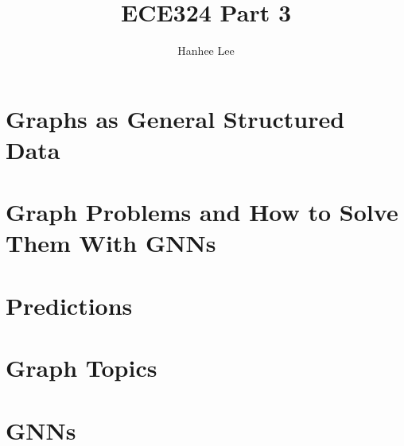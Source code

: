 \documentclass{article}
\title{ECE324 Part 3}
\author{Hanhee Lee}
\begin{document}
\section{Graphs as General Structured Data}

\newpage

\section{Graph Problems and How to Solve Them With GNNs}

\newpage

\section{Predictions}

\newpage

\section{Graph Topics}

\newpage

\section{GNNs}

\end{document}
